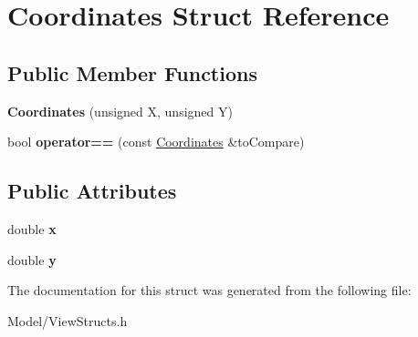 \hypertarget{struct_coordinates}{}\section{Coordinates Struct Reference}
\label{struct_coordinates}
\subsection*{Public Member Functions}
\begin{DoxyCompactItemize}
\item 
\hypertarget{struct_coordinates_a3c9424e6680c0d2f83ef81da7336ae7a}{}{\bfseries Coordinates} (unsigned X, unsigned Y)\label{struct_coordinates_a3c9424e6680c0d2f83ef81da7336ae7a}

\item 
\hypertarget{struct_coordinates_a10a21564060e00687760071f3c1a4c02}{}bool {\bfseries operator==} (const \hyperlink{struct_coordinates}{Coordinates} \&to\+Compare)\label{struct_coordinates_a10a21564060e00687760071f3c1a4c02}

\end{DoxyCompactItemize}
\subsection*{Public Attributes}
\begin{DoxyCompactItemize}
\item 
\hypertarget{struct_coordinates_a858fd248e4b9ae45cbceeb6bdc7d011b}{}double {\bfseries x}\label{struct_coordinates_a858fd248e4b9ae45cbceeb6bdc7d011b}

\item 
\hypertarget{struct_coordinates_ab89961ba893566971c26e8bf5f377d49}{}double {\bfseries y}\label{struct_coordinates_ab89961ba893566971c26e8bf5f377d49}

\end{DoxyCompactItemize}


The documentation for this struct was generated from the following file\+:\begin{DoxyCompactItemize}
\item 
Model/View\+Structs.\+h\end{DoxyCompactItemize}
